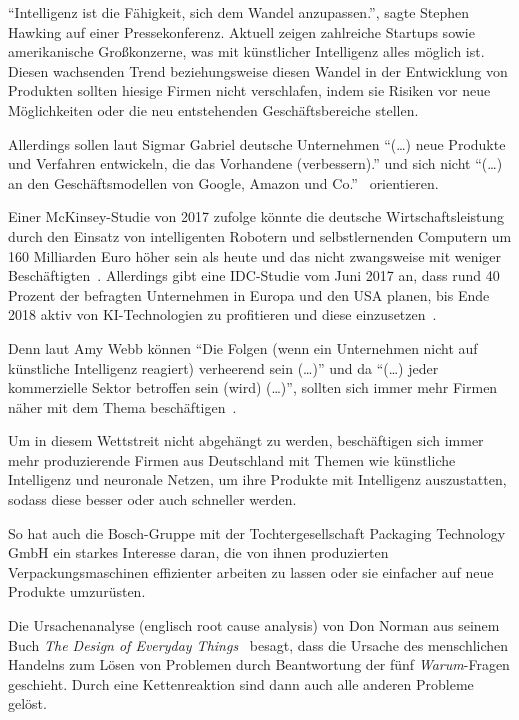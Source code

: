 \enquote{Intelligenz ist die Fähigkeit, sich dem Wandel anzupassen.}, sagte Stephen Hawking auf einer Pressekonferenz.
Aktuell zeigen zahlreiche Startups sowie amerikanische Großkonzerne, was mit künstlicher Intelligenz alles möglich ist.
Diesen wachsenden Trend beziehungsweise diesen Wandel in der Entwicklung von Produkten sollten hiesige Firmen nicht
verschlafen, indem sie Risiken vor neue Möglichkeiten oder die neu entstehenden Geschäftsbereiche stellen.

Allerdings sollen laut Sigmar Gabriel deutsche Unternehmen \enquote{(\ldots) neue Produkte und Verfahren
entwickeln, die das Vorhandene (verbessern).} und sich nicht \enquote{(\ldots) an den Geschäftsmodellen von Google,
Amazon und Co.}~\cite{article_einleitung_ww_sg} orientieren.

Einer McKinsey-Studie von 2017 zufolge könnte die deutsche Wirtschaftsleistung durch den Einsatz von intelligenten
Robotern und selbstlernenden Computern um 160 Milliarden Euro höher sein als heute und das nicht zwangsweise mit weniger
Beschäftigten~\cite{online_einleitung_mckinsey}. Allerdings gibt eine IDC-Studie vom Juni 2017 an, dass rund 40 Prozent
der befragten Unternehmen in Europa und den USA planen, bis Ende 2018 aktiv von KI-Technologien zu profitieren und diese
einzusetzen~\cite{article_grundlagen_salesforce}.

Denn laut Amy Webb können \enquote{Die Folgen (wenn ein Unternehmen nicht auf künstliche Intelligenz reagiert)
verheerend sein (\ldots)} und da \enquote{(\ldots) jeder kommerzielle Sektor betroffen sein (wird) (\ldots)}, sollten
sich immer mehr Firmen näher mit dem Thema beschäftigen~\cite{article_einleitung_dub_aw}.

Um in diesem Wettstreit nicht abgehängt zu werden, beschäftigen sich immer mehr produzierende Firmen aus Deutschland mit
Themen wie künstliche Intelligenz und neuronale Netzen, um ihre Produkte mit Intelligenz auszustatten, sodass diese
besser oder auch schneller werden.

So hat auch die Bosch-Gruppe mit der Tochtergesellschaft Packaging Technology GmbH ein starkes Interesse daran, die von
ihnen produzierten Verpackungsmaschinen effizienter arbeiten zu lassen oder sie einfacher auf neue Produkte umzurüsten.

Die Ursachenanalyse (englisch root cause analysis) von Don Norman aus seinem Buch \textit{The Design of Everyday
Things}~\cite{book_einleitung_donnorman} besagt, dass die Ursache des menschlichen Handelns zum Lösen von Problemen
durch Beantwortung der fünf \textit{Warum}-Fragen geschieht. Durch eine Kettenreaktion sind dann auch alle anderen
Probleme gelöst.

